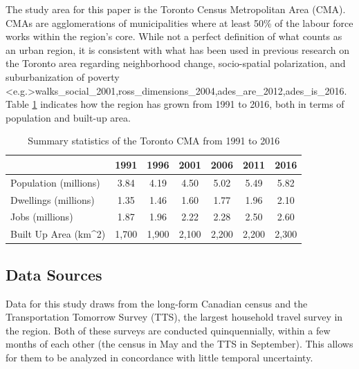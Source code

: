 The study area for this paper is the Toronto Census Metropolitan Area (CMA). CMAs are agglomerations of municipalities where at least 50\% of the labour force works within the region's core. While not a perfect definition of what counts as an urban region, it is consistent with what has been used in previous research on the Toronto area regarding neighborhood change, socio-spatial polarization, and suburbanization of poverty \shortcite<e.g.>{walks_social_2001,ross_dimensions_2004,ades_are_2012,ades_is_2016}. 
Table \ref{table:summary} indicates how the region has grown from 1991 to 2016, both in terms of population and built-up area.


\begin{table}[H]
	\small
	\centering
	\caption{{Summary statistics of the Toronto CMA from 1991 to 2016}}
	\label{table:summary}
	\begin{tabular}{lcccccc}
		\hline
		\textbf{}                          & \textbf{1991} & \textbf{1996} & \textbf{2001} & \textbf{2006} & \textbf{2011} & \textbf{2016} \\
		\hline
		Population (millions)                      & 3.84   & 4.19   & 4.50   & 5.02   & 5.49   & 5.82   \\
		Dwellings (millions)                       & 1.35   & 1.46   & 1.60   & 1.77   & 1.96   & 2.10   \\
		Jobs (millions)                                                    & 1.87    & 1.96    & 2.22   & 2.28    & 2.50     & 2.60  \\
		Built Up Area (km\textasciicircum{}2)      & 1,700  & 1,900  & 2,100  & 2,200  & 2,200  & 2,300  \\
		
		\hline 
	\end{tabular}
\end{table}

\subsection{Data Sources}

Data for this study draws from the long-form Canadian census and the Transportation Tomorrow Survey (TTS), the largest household travel survey in the region. Both of these surveys are conducted quinquennially, within a few months of each other (the census in May and the TTS in September). This allows for them to be analyzed in concordance with little temporal uncertainty. 

